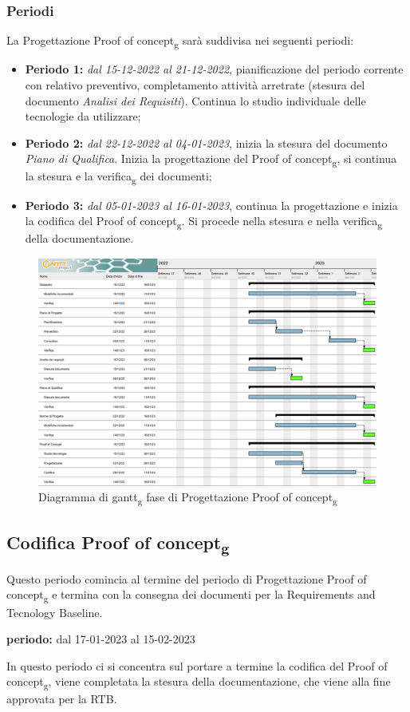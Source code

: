 \subsubsection{Periodi}
La Progettazione Proof of concept\textsubscript{g} sarà suddivisa nei seguenti periodi:
\begin{itemize}
\item \textbf{Periodo 1:} \textit{dal 15-12-2022 al 21-12-2022}, pianificazione del periodo corrente con relativo preventivo, completamento attività arretrate 
(stesura del documento \textit{Analisi dei Requisiti}). Continua lo studio individuale delle tecnologie da utilizzare;
\item \textbf{Periodo 2:} \textit{dal 22-12-2022 al 04-01-2023}, inizia la stesura del documento \textit{Piano di Qualifica}. Inizia la progettazione del Proof of concept\textsubscript{g}, si continua la stesura e la verifica\textsubscript{g} dei documenti;
\item \textbf{Periodo 3:} \textit{dal 05-01-2023 al 16-01-2023}, continua la progettazione e inizia la codifica del Proof of concept\textsubscript{g}. Si procede nella stesura e nella verifica\textsubscript{g} della documentazione.
\end{itemize}

\begin{figure}[H]
    \centering
    \includegraphics[scale=0.72]{image/gantt_poc.png}
    \caption{Diagramma di gantt\textsubscript{g} fase di Progettazione Proof of concept\textsubscript{g}}
\end{figure}
\pagebreak

\subsection{Codifica Proof of concept\textsubscript{g}}
Questo periodo comincia al termine del periodo di Progettazione Proof of concept\textsubscript{g} e termina con 
la consegna dei documenti per la Requirements and Tecnology Baseline.\\
\begin{center}
\textbf{periodo:} dal 17-01-2023 al 15-02-2023\\
\end{center}
In questo periodo ci si concentra sul portare a termine la codifica del Proof of concept\textsubscript{g}, viene completata la stesura della documentazione, che 
viene alla fine approvata per la RTB. 

